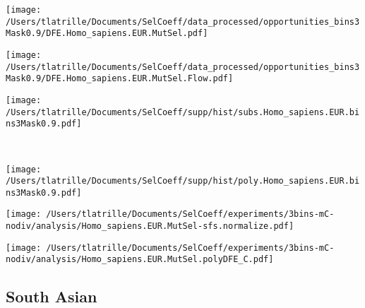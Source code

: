 \documentclass{article}
\begin{document}
    \begin{minipage}{0.32\linewidth}
        \texttt{[image: /Users/tlatrille/Documents/SelCoeff/data\_processed/opportunities\_bins3Mask0.9/DFE.Homo\_sapiens.EUR.MutSel.pdf]}
    \end{minipage}
    \begin{minipage}{0.32\linewidth}
        \texttt{[image: /Users/tlatrille/Documents/SelCoeff/data\_processed/opportunities\_bins3Mask0.9/DFE.Homo\_sapiens.EUR.MutSel.Flow.pdf]}
    \end{minipage}
    \begin{minipage}{0.32\linewidth}
        \texttt{[image: /Users/tlatrille/Documents/SelCoeff/supp/hist/subs.Homo\_sapiens.EUR.bins3Mask0.9.pdf]}
    \end{minipage}
    \\
    \begin{minipage}{0.32\linewidth}
        \texttt{[image: /Users/tlatrille/Documents/SelCoeff/supp/hist/poly.Homo\_sapiens.EUR.bins3Mask0.9.pdf]}
    \end{minipage}
    \begin{minipage}{0.32\linewidth}
        \texttt{[image: /Users/tlatrille/Documents/SelCoeff/experiments/3bins-mC-nodiv/analysis/Homo\_sapiens.EUR.MutSel-sfs.normalize.pdf]}
    \end{minipage}
    \begin{minipage}{0.32\linewidth}
        \texttt{[image: /Users/tlatrille/Documents/SelCoeff/experiments/3bins-mC-nodiv/analysis/Homo\_sapiens.EUR.MutSel.polyDFE\_C.pdf]}
    \end{minipage}
    \subsection{South Asian}
\end{document}
